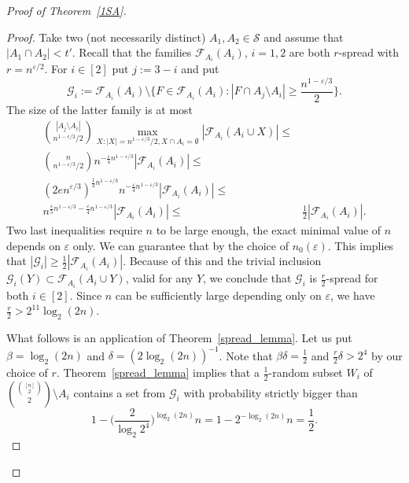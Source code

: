 \documentclass[11pt,letterpaper]{amsart}
\newcommand{\eps}{\varepsilon}
\renewcommand{\le}{\leqslant}
\renewcommand{\ge}{\geqslant}
\newcommand{\ff}{\mathcal{F}}
\newcommand{\g}{\mathcal{G}}
\begin{document}
\begin{proof}[Proof of Theorem~\ref{1SA}]
\begin{proof}
  Take two (not necessarily distinct) $A_1,A_2\in \mathcal S$  and assume that $|A_1\cap A_2|<t'$. Recall that the families $\ff_{A_i}(A_i)$, $i=1,2$ are both $r$-spread with $r = n^{\eps/2}$. 
  For $i\in [2]$ put $j:=3-i$ and put
  $$\g_i:=\ff_{A_i}(A_i)\setminus\Big\{F\in \ff_{A_i}(A_i): |F\cap A_j\setminus A_i|\ge \frac{n^{1-\eps/3}}2\Big\}.$$ The size of the latter family is at most
 \begin{align*}{|A_j\setminus A_i|\choose n^{1-\epsilon/3}/2}\max_{X: |X| = n^{1-\eps/3}/2, X\cap A_i = \emptyset}|\ff_{A_i}(A_i\cup X)|\le&\\  {n\choose n^{1-\eps/3}/2}n^{-\frac\eps 4 n^{1-\eps/3}}|\ff_{A_i}(A_i)|\le&\\
  (2e n^{\eps/3})^{\frac 12n^{1-\eps/3}}n^{-\frac\eps 4 n^{1-\eps/3}}|\ff_{A_i}(A_i)|\le&\\
  n^{\frac{\eps}5n^{1 - \eps/3} - \frac{\eps}4n^{1 - \eps/3}}|\ff_{A_i}(A_i)| \le&\frac 12 |\ff_{A_i}(A_i)|.\end{align*}
  Two last inequalities require $n$ to be large enough, the exact minimal value of $n$ depends on $\eps$ only. We can guarantee that by the choice of $n_0(\eps)$. This implies that $|\g_i|\ge \frac 12 |\ff_{A_i}(A_i)|$.
 Because of this and the trivial inclusion $\g_i(Y)\subset \ff_{A_i}(A_i\cup Y)$, valid for any $Y$,  we conclude that $\g_i$ is $ \frac r2$-spread for both $i\in [2]$. Since $n$ can be sufficiently large depending only on $\eps$, we have $\frac r2 > 2^{11}\log_2(2n)$.  



  What follows is an application of Theorem~\ref{spread_lemma}. Let us put $\beta= \log_2(2n)$ and $\delta = (2\log_2(2n))^{-1}$. Note that $\beta\delta = \frac 12$ and $\frac r2\delta > 2^{4}$ by our choice of $r$.  Theorem~\ref{spread_lemma} implies that a $\frac{1}2$-random subset $W_i$ of ${{[n]\choose 2}\choose 2}\setminus A_i$ contains a set from $\g_i$ with probability strictly bigger than
  $$1-\Big(\frac 2{\log_2 2^{4}}\Big)^{\log_2 (2n)} n = 1-2^{-\log_2 (2n)} n = \frac 12.$$


\end{proof}
\end{proof}
\end{document}
